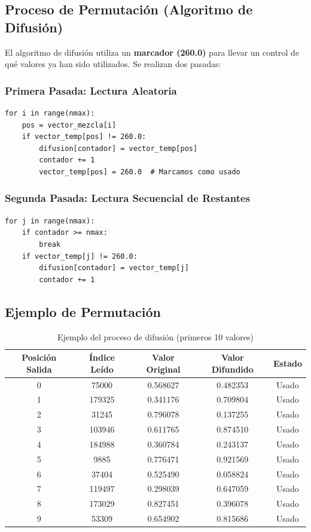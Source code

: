 \documentclass[12pt,a4paper]{article}
\begin{document}
	\subsection{Proceso de Permutación (Algoritmo de Difusión)}
	
	El algoritmo de difusión utiliza un \textbf{marcador (260.0)} para llevar un control de qué valores ya han sido utilizados. Se realizan dos pasadas:
	
	\subsubsection{Primera Pasada: Lectura Aleatoria}
	\begin{lstlisting}
for i in range(nmax):
	pos = vector_mezcla[i]
	if vector_temp[pos] != 260.0:
		difusion[contador] = vector_temp[pos]
		contador += 1
		vector_temp[pos] = 260.0  # Marcamos como usado
	\end{lstlisting}
	
	\subsubsection{Segunda Pasada: Lectura Secuencial de Restantes}
	\begin{lstlisting}
for j in range(nmax):
	if contador >= nmax:
		break
	if vector_temp[j] != 260.0:
		difusion[contador] = vector_temp[j]
		contador += 1
	\end{lstlisting}
	
	\subsection{Ejemplo de Permutación}
	
	\begin{table}[H]
		\centering
		\caption{Ejemplo del proceso de difusión (primeros 10 valores)}
		\label{tab:diffusion}
		\begin{tabular}{@{}ccccc@{}}
			\toprule
			\textbf{Posición Salida} & \textbf{Índice Leído} & \textbf{Valor Original} & \textbf{Valor Difundido} & \textbf{Estado} \\ \midrule
			0 & 75000 & 0.568627 & 0.482353 & Usado \\
			1 & 179325 & 0.341176 & 0.709804 & Usado \\
			2 & 31245 & 0.796078 & 0.137255 & Usado \\
			3 & 103946 & 0.611765 & 0.874510 & Usado \\
			4 & 184988 & 0.360784 & 0.243137 & Usado \\
			5 & 9885 & 0.776471 & 0.921569 & Usado \\
			6 & 37404 & 0.525490 & 0.058824 & Usado \\
			7 & 119497 & 0.298039 & 0.647059 & Usado \\
			8 & 173029 & 0.827451 & 0.396078 & Usado \\
			9 & 53309 & 0.654902 & 0.815686 & Usado \\ \bottomrule
		\end{tabular}
	\end{table}
	
\end{document}
